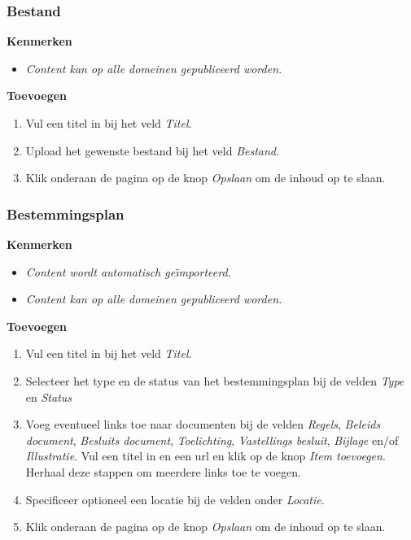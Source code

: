 \subsubsection{Bestand}\label{bestand}

\textbf{Kenmerken}

\begin{itemize}
\item \emph{Content kan op alle domeinen gepubliceerd worden.}
\end{itemize}

\textbf{Toevoegen}

\begin{enumerate}
\item Vul een titel in bij het veld \emph{Titel}.
\item Upload het gewenste bestand bij het veld \emph{Bestand}.
\item Klik onderaan de pagina op de knop \emph{Opslaan} om de inhoud op te slaan.
\end{enumerate}

\subsubsection{Bestemmingsplan}\label{bestemmingsplan}

\textbf{Kenmerken}

\begin{itemize}
\item \emph{Content wordt automatisch ge{\"\i}mporteerd.}
\item \emph{Content kan op alle domeinen gepubliceerd worden.}
\end{itemize}

\textbf{Toevoegen}

\begin{enumerate}
\item Vul een titel in bij het veld \emph{Titel}.
\item Selecteer het type en de status van het bestemmingsplan bij de velden \emph{Type} en \emph{Status}
\item Voeg eventueel links toe naar documenten bij de velden \emph{Regels}, \emph{Beleids document}, \emph{Besluits document}, \emph{Toelichting}, \emph{Vastellings besluit}, \emph{Bijlage} en/of \emph{Illustratie}. Vul een titel in en een url en klik op de knop \emph{Item toevoegen}. Herhaal deze stappen om meerdere links toe te voegen. 
\item Specificeer optioneel een locatie bij de velden onder \emph{Locatie}.
\item Klik onderaan de pagina op de knop \emph{Opslaan} om de inhoud op te slaan.
\end{enumerate}

